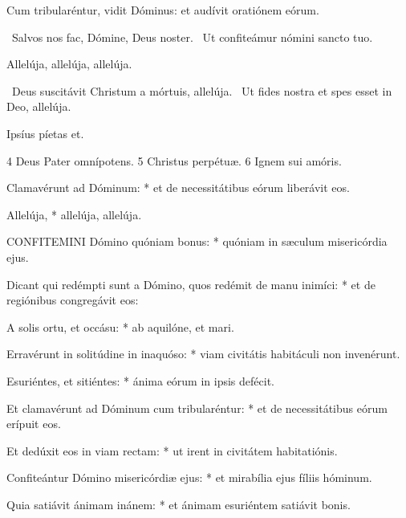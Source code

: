  Cum tribularéntur, vidit Dóminus: et audívit oratiónem eórum.

\sectionornament



\V\ Salvos nos fac, Dómine, Deus noster. \R\ Ut confiteámur nómini sancto tuo.



 Allelúja, allelúja, allelúja.

\V\ Deus suscitávit Christum a mórtuis, allelúja. \R\ Ut fides nostra et spes esset in Deo, allelúja.

 Ipsíus píetas et.

 4 Deus Pater omnípotens. 5 Christus perpétuæ. 6 Ignem sui amóris.



 Clamavérunt ad Dóminum: * et de necessitátibus eórum liberávit eos.


 Allelúja, * allelúja, allelúja.


\lettrine[lines=2]{C}{ONFITEMINI} Dómino quóniam bonus: * quóniam in sæculum misericórdia ejus.

Dicant qui redémpti sunt a Dómino, quos redémit de manu inimíci: * et de regiónibus congregávit eos:

A solis ortu, et occásu: * ab aquilóne, et mari.

Erravérunt in solitúdine in inaquóso: * viam civitátis habitáculi non invenérunt.

Esuriéntes, et sitiéntes: * ánima eórum in ipsis defécit.

Et clamavérunt ad Dóminum cum tribularéntur: * et de necessitátibus eórum erípuit eos.

Et dedúxit eos in viam rectam: * ut irent in civitátem habitatiónis.

Confiteántur Dómino misericórdiæ ejus: * et mirabília ejus fíliis hóminum.

Quia satiávit ánimam inánem: * et ánimam esuriéntem satiávit bonis.

